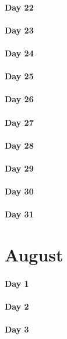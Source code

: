 \documentclass[UTF8,a4paper,8pt]{ctexart}
\begin{document}
 	 \paragraph{Day 22      \quad     }
 	 \paragraph{Day 23      \quad     }
 	 \paragraph{Day 24      \quad     }
 	 \paragraph{Day 25      \quad     }
 	 \paragraph{Day 26      \quad     }
 	 \paragraph{Day 27      \quad     }
 	 \paragraph{Day 28      \quad     }
 	 \paragraph{Day 29      \quad     }   
 	 \paragraph{Day 30      \quad     }
 	 \paragraph{Day 31      \quad     }
\section{August}
 	 \paragraph{Day 1       \quad     }
 	 \paragraph{Day 2       \quad     }
 	 \paragraph{Day 3       \quad     }
\end{document}
